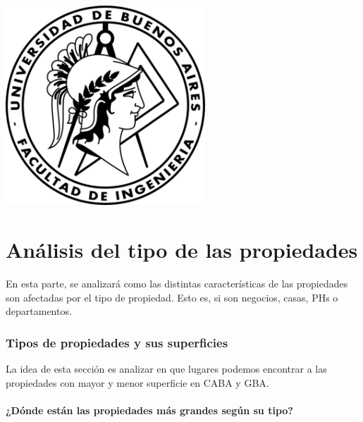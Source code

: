 \documentclass[a4paper, 10pt]{article}
\begin{document}
    \newpage

    \begin{center}
        \includegraphics[width=7.5cm, height=7.5cm]{images/logo}
    \end{center}


    \maketitle
    \newpage
    \tableofcontents
    \newpage
	\part{Análisis del tipo de las propiedades}
		En esta parte, se analizará como las distintas características de las propiedades son afectadas por el tipo de propiedad.
		Esto es, si son negocios, casas, PHs o departamentos.
		\section{Tipos de propiedades y sus superficies}
			La idea de esta sección es analizar en que lugares podemos encontrar a las propiedades con mayor y menor superficie
			en CABA y GBA.
			\subsection{¿Dónde están las propiedades más grandes según su tipo?}
\end{document}

